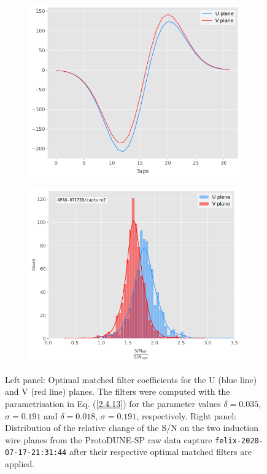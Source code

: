 \begin{figure}[t]
	\begin{subfigure}{0.5\textwidth}
		\centering
		\includegraphics[width=.99\linewidth]{Images/Matched_Filter/optimal_coeffs}
	\end{subfigure}
	\begin{subfigure}{0.5\textwidth}
		\centering
		\includegraphics[width=.99\linewidth]{Images/Matched_Filter/improvement_capture}
	\end{subfigure}
	\caption[Distribution of the change in the S/N on the induction planes from the ProtoDUNE-SP raw data capture after the optimal matched filters are applied.]{Left panel: Optimal matched filter coefficients for the U (blue line) and V (red line) planes. The filters were computed with the parametrisation in Eq. (\ref{2.4.13}) for the parameter values $\delta = 0.035$, $\sigma = 0.191$ and $\delta = 0.018$, $\sigma = 0.191$, respectively. Right panel: Distribution of the relative change of the S/N on the two induction wire planes from the ProtoDUNE-SP raw data capture \texttt{felix-2020-07-17-21:31:44} after their respective optimal matched filters are applied.}
	\label{fig:mf_perf}
\end{figure}

